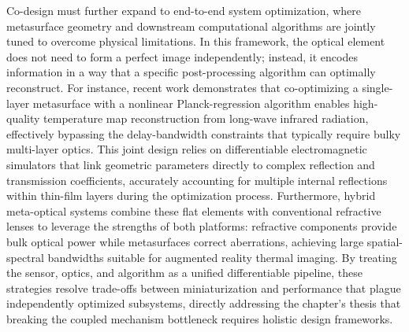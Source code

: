 Co-design must further expand to end-to-end system optimization, where metasurface geometry and downstream computational algorithms are jointly tuned to overcome physical limitations. In this framework, the optical element does not need to form a perfect image independently; instead, it encodes information in a way that a specific post-processing algorithm can optimally reconstruct. For instance, recent work demonstrates that co-optimizing a single-layer metasurface with a nonlinear Planck-regression algorithm enables high-quality temperature map reconstruction from long-wave infrared radiation, effectively bypassing the delay-bandwidth constraints that typically require bulky multi-layer optics. This joint design relies on differentiable electromagnetic simulators that link geometric parameters directly to complex reflection and transmission coefficients, accurately accounting for multiple internal reflections within thin-film layers during the optimization process. Furthermore, hybrid meta-optical systems combine these flat elements with conventional refractive lenses to leverage the strengths of both platforms: refractive components provide bulk optical power while metasurfaces correct aberrations, achieving large spatial-spectral bandwidths suitable for augmented reality thermal imaging. By treating the sensor, optics, and algorithm as a unified differentiable pipeline, these strategies resolve trade-offs between miniaturization and performance that plague independently optimized subsystems, directly addressing the chapter's thesis that breaking the coupled mechanism bottleneck requires holistic design frameworks. \citep{doi_10_1002_adom_202402498_4083d234} \citep{doi_10_1002_lpor_71431_d57da40c}

